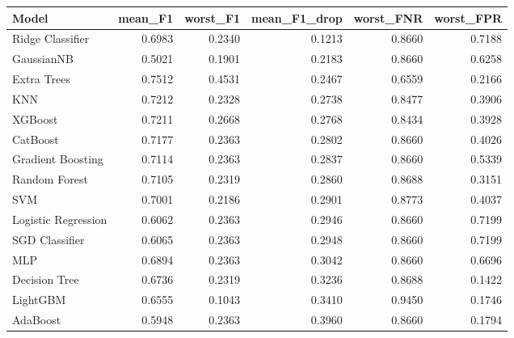 \begin{tabular}{lrrrrr}
\toprule
Model & mean\_F1 & worst\_F1 & mean\_F1\_drop & worst\_FNR & worst\_FPR \\
\midrule
Ridge Classifier & 0.6983 & 0.2340 & 0.1213 & 0.8660 & 0.7188 \\
GaussianNB & 0.5021 & 0.1901 & 0.2183 & 0.8660 & 0.6258 \\
Extra Trees & 0.7512 & 0.4531 & 0.2467 & 0.6559 & 0.2166 \\
KNN & 0.7212 & 0.2328 & 0.2738 & 0.8477 & 0.3906 \\
XGBoost & 0.7211 & 0.2668 & 0.2768 & 0.8434 & 0.3928 \\
CatBoost & 0.7177 & 0.2363 & 0.2802 & 0.8660 & 0.4026 \\
Gradient Boosting & 0.7114 & 0.2363 & 0.2837 & 0.8660 & 0.5339 \\
Random Forest & 0.7105 & 0.2319 & 0.2860 & 0.8688 & 0.3151 \\
SVM & 0.7001 & 0.2186 & 0.2901 & 0.8773 & 0.4037 \\
Logistic Regression & 0.6062 & 0.2363 & 0.2946 & 0.8660 & 0.7199 \\
SGD Classifier & 0.6065 & 0.2363 & 0.2948 & 0.8660 & 0.7199 \\
MLP & 0.6894 & 0.2363 & 0.3042 & 0.8660 & 0.6696 \\
Decision Tree & 0.6736 & 0.2319 & 0.3236 & 0.8688 & 0.1422 \\
LightGBM & 0.6555 & 0.1043 & 0.3410 & 0.9450 & 0.1746 \\
AdaBoost & 0.5948 & 0.2363 & 0.3960 & 0.8660 & 0.1794 \\
\bottomrule
\end{tabular}
